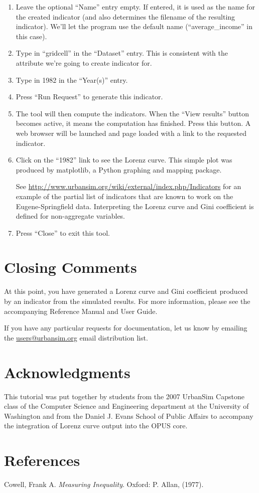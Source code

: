 \documentclass{howto}
\begin{document}
\begin{enumerate}
\item Leave the optional ``Name'' entry empty. If entered, it is used
as the name for the created indicator (and also determines the filename of the
resulting indicator). We'll let the program use the default name
(``average_income'' in this case).

\item Type in ``gridcell'' in the ``Dataset'' entry.  This is consistent with the attribute 
we're going to create indicator for. 

\item Type in 1982 in the ``Year(s)'' entry. 

\item Press ``Run Request'' to generate this indicator.

\item The tool will then compute the indicators. When the
``View results'' button becomes active, it means the computation has finished.
Press this button. A web
browser will be launched and page loaded with a link to the requested indicator.

\item Click on the ``1982'' link to see the Lorenz curve. This simple plot was
produced by matplotlib, a Python graphing and mapping package.  


See \url{http://www.urbansim.org/wiki/external/index.php/Indicators} for an example of the partial list of indicators that are known to work on the Eugene-Springfield data.  Interpreting the Lorenz curve and Gini coefficient is defined for non-aggregate variables.  

\item Press ``Close'' to exit this tool.

\end{enumerate}

\section{Closing Comments}

At this point, you have generated a Lorenz curve and Gini coefficient 
produced by an indicator from the simulated results. 
For more information, please see the accompanying Reference Manual and User Guide. 

If you have any particular requests for documentation, let us know by emailing
the \url{users@urbansim.org} email distribution list.

\section{Acknowledgments}

This tutorial was put together by students from the 2007 UrbanSim Capstone class of the Computer
Science and Engineering department at the University of Washington
and from the Daniel J. Evans School of Public Affairs to accompany the integration
of Lorenz curve output into the OPUS core.

\section{References}
Cowell, Frank A. \emph{Measuring Inequality}. Oxford: P. Allan, (1977).
\end{document}
